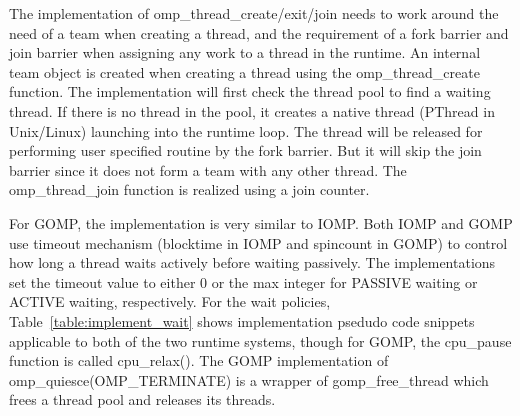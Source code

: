The implementation of  {\sf omp\_thread\_create/exit/join} needs to work around the need of a team when creating a thread, and the requirement 
of a fork barrier and join barrier when assigning any work to a thread in the runtime. An internal team object is created when creating a thread 
using the {\sf omp\_thread\_create} function. The implementation will first check the thread pool to find a waiting thread. If there is no thread
in the pool, it creates a native thread (PThread in Unix/Linux) launching into the runtime loop. The thread will be released for performing
user specified routine by the fork barrier. But it will skip the join barrier since it does not form a team with any other thread. 
The {\sf omp\_thread\_join} function is realized using a join counter. 

For GOMP, the implementation is very similar to IOMP.
Both IOMP and GOMP use timeout mechanism (blocktime in IOMP and spincount in GOMP) 
to control how long a thread waits actively before waiting passively. The implementations set the timeout value to either 0 or the max integer 
for {\sf PASSIVE} waiting or {\sf ACTIVE} waiting, respectively. 
For the wait policies, Table~\ref{table:implement_wait} shows implementation psedudo code snippets applicable to both of 
the two runtime systems, though for GOMP, the cpu\_pause function is called cpu\_relax().  
The GOMP implementation of {\sf omp\_quiesce(OMP\_TERMINATE)} is a wrapper of {\sf gomp\_free\_thread} 
which frees a thread pool and releases its threads. 


